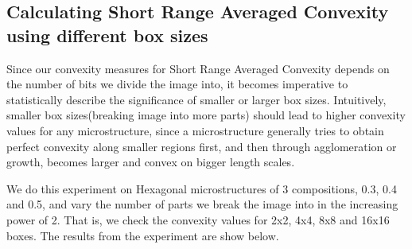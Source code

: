 \documentclass[12pt, a4paper]{report}
\begin{document}
\subsection{Calculating Short Range Averaged Convexity using different box sizes}
Since our convexity measures for Short Range Averaged Convexity depends on the number of bits we divide the image into, it becomes imperative to statistically describe the significance of smaller or larger box sizes. Intuitively, smaller box sizes(breaking image into more parts) should lead to higher convexity values for any microstructure, since a microstructure generally tries to obtain perfect convexity along smaller regions first, and then through agglomeration or growth, becomes larger and convex on bigger length scales. 

We do this experiment on Hexagonal microstructures of 3 compositions, 0.3, 0.4 and 0.5, and vary the number of parts we break the image into in the increasing power of 2. That is, we check the convexity values for 2x2, 4x4, 8x8 and 16x16 boxes. The results from the experiment are show below.
\end{document}
